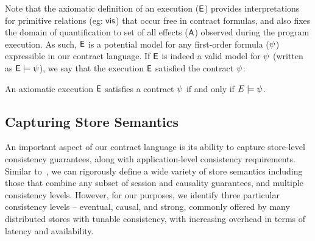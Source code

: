 Note that the axiomatic definition of an execution (${\normalfont \textsf{E}}$) provides
interpretations for primitive relations (eg: ${\normalfont \textsf{vis}}$) that occur free in
contract formulas, and also fixes the domain of quantification to set of all
effects (${\normalfont \textsf{A}}$) observed during the program execution. As such, ${\normalfont \textsf{E}}$ is a
potential model for any first-order formula ($\psi$) expressible in our contract
language. If ${\normalfont \textsf{E}}$ is indeed a valid model for $\psi$ (written as ${\normalfont \textsf{E}} \models
\psi$), we say that the execution ${\normalfont \textsf{E}}$ satisfied the contract $\psi$:
\begin{definition}
An axiomatic execution ${\normalfont \textsf{E}}$  satisfies a contract $\psi$ if and
only if $E \models \psi$.
\end{definition}

\subsection{Capturing Store Semantics}
\label{sec:store_sem}

An important aspect of our contract language is its ability to capture
store-level consistency guarantees, along with application-level consistency
requirements. Similar to~\cite{Burckhardt2014}, we can rigorously define a wide
variety of store semantics including those that combine any subset of session
and causality guarantees, and multiple consistency levels.  However, for our
purposes, we identify three particular consistency levels -- eventual, causal,
and strong, commonly offered by many distributed stores with tunable
consistency, with increasing overhead in terms of latency and availability.

